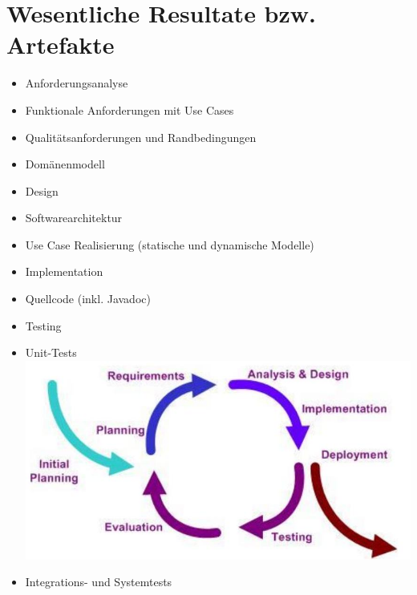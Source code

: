 \section*{Wesentliche Resultate bzw. Artefakte}
\begin{itemize}
  \item Anforderungsanalyse
  \item Funktionale Anforderungen mit Use Cases
  \item Qualitätsanforderungen und Randbedingungen
  \item Domänenmodell
  \item Design
  \item Softwarearchitektur
  \item Use Case Realisierung (statische und dynamische Modelle)
  \item Implementation
  \item Quellcode (inkl. Javadoc)
  \item Testing
  \item Unit-Tests\\
\includegraphics[width=\linewidth]{images/2025_01_02_6eafa38dd4ae10c9a392g-09}
  \item Integrations- und Systemtests
\end{itemize}

